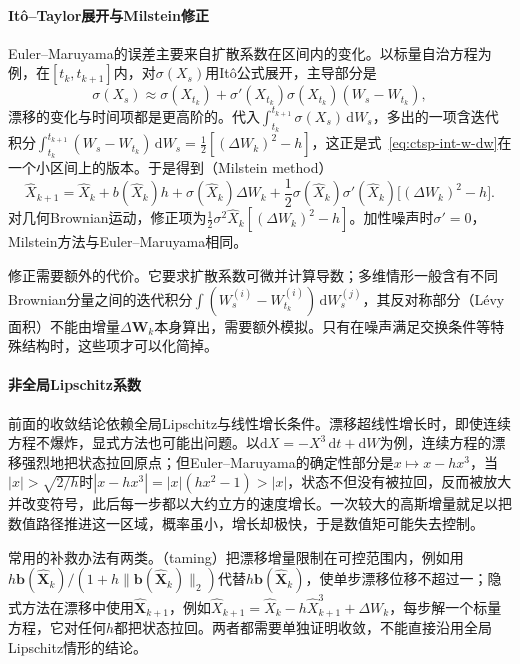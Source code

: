 \paragraph{Itô--Taylor展开与Milstein修正}
Euler--Maruyama的误差主要来自扩散系数在区间内的变化。以标量自治方程为例，在$[t_k,t_{k+1}]$内，对$\sigma(X_s)$用Itô公式展开，主导部分是
\[
  \sigma(X_s)\approx\sigma(X_{t_k})+\sigma'(X_{t_k})\sigma(X_{t_k})(W_s-W_{t_k}),
\]
漂移的变化与时间项都是更高阶的。代入$\int_{t_k}^{t_{k+1}}\sigma(X_s)\,\mathrm dW_s$，多出的一项含迭代积分$\int_{t_k}^{t_{k+1}}(W_s-W_{t_k})\,\mathrm dW_s=\frac12[(\Delta W_k)^2-h]$，这正是式~\eqref{eq:ctsp-int-w-dw}在一个小区间上的版本。于是得到（Milstein method）
\begin{equation}
  \widehat X_{k+1}=\widehat X_k+b(\widehat X_k)h+\sigma(\widehat X_k)\Delta W_k+\frac12\sigma(\widehat X_k)\sigma'(\widehat X_k)\bigl[(\Delta W_k)^2-h\bigr].
  \label{eq:ctsp-milstein}
\end{equation}
对几何Brownian运动，修正项为$\frac12\sigma^2\widehat X_k[(\Delta W_k)^2-h]$。加性噪声时$\sigma'=0$，Milstein方法与Euler--Maruyama相同。

修正需要额外的代价。它要求扩散系数可微并计算导数；多维情形一般含有不同Brownian分量之间的迭代积分$\int(W^{(i)}_s-W^{(i)}_{t_k})\,\mathrm dW^{(j)}_s$，其反对称部分（Lévy面积）不能由增量$\Delta\bm W_k$本身算出，需要额外模拟。只有在噪声满足交换条件等特殊结构时，这些项才可以化简掉。

\paragraph{非全局Lipschitz系数}
前面的收敛结论依赖全局Lipschitz与线性增长条件。漂移超线性增长时，即使连续方程不爆炸，显式方法也可能出问题。以$\mathrm dX=-X^3\,\mathrm dt+\mathrm dW$为例，连续方程的漂移强烈地把状态拉回原点；但Euler--Maruyama的确定性部分是$x\mapsto x-hx^3$，当$|x|>\sqrt{2/h}$时$|x-hx^3|=|x|(hx^2-1)>|x|$，状态不但没有被拉回，反而被放大并改变符号，此后每一步都以大约立方的速度增长。一次较大的高斯增量就足以把数值路径推进这一区域，概率虽小，增长却极快，于是数值矩可能失去控制。

常用的补救办法有两类。（taming）把漂移增量限制在可控范围内，例如用$h\bm b(\widehat{\bm X}_k)/(1+h\|\bm b(\widehat{\bm X}_k)\|_2)$代替$h\bm b(\widehat{\bm X}_k)$，使单步漂移位移不超过一；隐式方法在漂移中使用$\widehat{\bm X}_{k+1}$，例如$\widehat X_{k+1}=\widehat X_k-h\widehat X_{k+1}^3+\Delta W_k$，每步解一个标量方程，它对任何$h$都把状态拉回。两者都需要单独证明收敛，不能直接沿用全局Lipschitz情形的结论。

